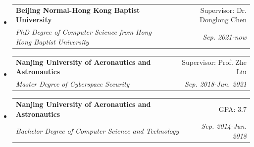 \documentclass[letterpaper,11pt]{article}
\makeatletter
\newcommand{\resitem}[1]{\item #1 \vspace{-2pt}}
\newcommand{\ressubheading}[4]{
\begin{tabular*}{6.5in}{l@{\cftdotfill{\cftsecdotsep}\extracolsep{\fill}}r}
		\textbf{#1} & #2 \\
		\textit{#3} & \textit{#4} \\
\end{tabular*}\vspace{-6pt}}
\makeatother
\begin{document}
\begin{itemize}
\item
	\ressubheading{Beijing Normal-Hong Kong Baptist University}{Supervisor: Dr. Donglong Chen}{PhD Degree of Computer Science from Hong Kong Baptist University}{Sep. 2021-now}
%
\item
	\ressubheading{Nanjing University of Aeronautics and Astronautics}{Supervisor: Prof. Zhe Liu}{Master Degree of Cyberspace Security}{Sep. 2018-Jun. 2021}
%

\item
	\ressubheading{Nanjing University of Aeronautics and Astronautics}{GPA: 3.7}{Bachelor Degree of Computer Science and Technology}{Sep. 2014-Jun. 2018}
%

\end{itemize}

%
\end{document}
